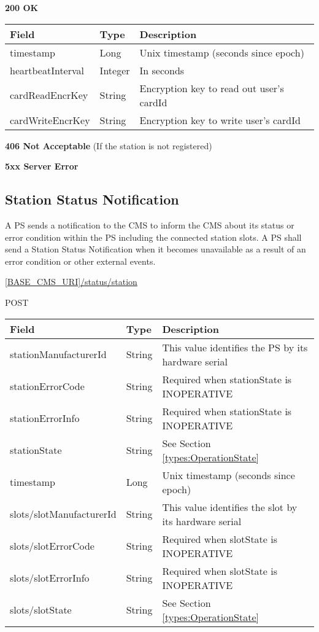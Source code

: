 \textbf{200 OK}

\begin{tabularx}{\linewidth}{ | l | l | X | }
  \hline
  \rowcolor{table-head}
  Field & Type & Description \\
  \hline
  timestamp & Long & Unix timestamp (seconds since epoch) \\
  heartbeatInterval & Integer & In seconds \\
  cardReadEncrKey & String & Encryption key to read out user's cardId \\
  cardWriteEncrKey & String & Encryption key to write user's cardId \\
    \hline
\end{tabularx}

\textbf{406 Not Acceptable} (If the station is not registered)

\textbf{5xx Server Error}

\subsection{Station Status Notification}

A \acs{PS} sends a notification to the \acs{CMS} to inform the \acs{CMS} about its status or error condition within the \acs{PS} including the connected station slots. A \acs{PS} shall send a Station Status Notification when it becomes unavailable as a result of an error condition or other external events.

 \url{[BASE_CMS_URI]/status/station}

 POST

\newpage
{}
\begin{table}[!h]
\vspace{-7mm}
\begin{tabularx}{\linewidth}{ | l  | l | X | }
  \hline
  \rowcolor{table-head}
  Field & Type & Description \\
  \hline
  stationManufacturerId & String 		& This value identifies the \acs{PS} by its hardware serial\\
  stationErrorCode & String & Required when stationState is INOPERATIVE \\
  stationErrorInfo & String & Required when stationState is INOPERATIVE \\
  stationState & String & See Section \ref{types:OperationState} \\
  timestamp & Long & Unix timestamp (seconds since epoch) \\
  slots/slotManufacturerId & String 	& This value identifies the slot by its hardware serial \\
  slots/slotErrorCode & String & Required when slotState is INOPERATIVE \\
  slots/slotErrorInfo & String & Required when slotState is INOPERATIVE \\
  slots/slotState & String & See Section \ref{types:OperationState} \\
  \hline
\end{tabularx}
\end{table}

